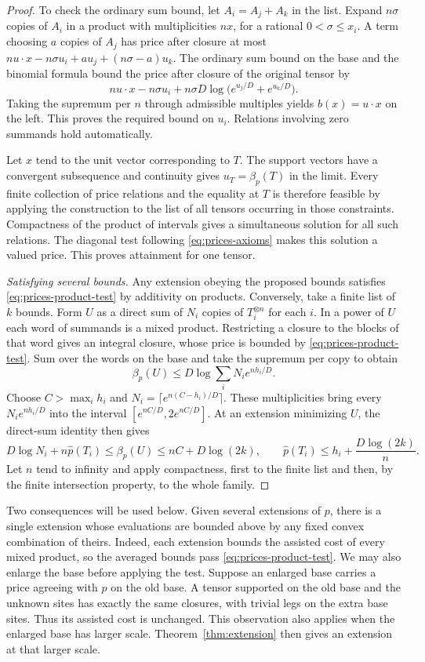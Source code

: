 \begin{proof}
To check the ordinary sum bound, let \(A_i=A_j+A_k\) in the list.
Expand \(n\sigma\) copies of \(A_i\) in a product with multiplicities
\(nx\), for a rational \(0<\sigma\le x_i\). A term choosing \(a\)
copies of \(A_j\) has price after closure at most
\(n u\cdot x-n\sigma u_i+a u_j+(n\sigma-a)u_k\).
The ordinary sum bound on the base and the binomial formula bound
the price after closure of the original tensor by
\[
 n u\cdot x-n\sigma u_i+
 n\sigma D\log\bigl(e^{u_j/D}+e^{u_k/D}\bigr).
\]
Taking the supremum per \(n\) through admissible multiples yields
\(b(x)=u\cdot x\) on the left. This proves the required bound on \(u_i\).
Relations involving zero summands hold automatically.

Let \(x\) tend to the unit vector corresponding to \(T\). The support
vectors have a convergent subsequence and continuity gives
\(u_T=\beta_p(T)\) in the limit. Every finite collection of price
relations and the equality at \(T\) is therefore feasible by applying the
construction to the list of all tensors occurring in those constraints.
Compactness of the product of intervals gives a simultaneous
solution for all such relations. The diagonal test following
\eqref{eq:prices-axioms} makes this solution a valued price. This proves
attainment for one tensor.

\smallskip\noindent
\emph{Satisfying several bounds.}
Any extension obeying the proposed bounds satisfies
\eqref{eq:prices-product-test} by additivity on products. Conversely,
take a finite list of \(k\) bounds. Form \(U\) as a direct sum of
\(N_i\) copies of \(T_i^{\otimes n}\) for each \(i\). In a power of
\(U\) each word of summands is a mixed product. Restricting a closure
to the blocks of that word gives an integral closure, whose price is
bounded by \eqref{eq:prices-product-test}. Sum over the words on the
base and take the supremum per copy to obtain
\[
 \beta_p(U)\le D\log\sum_i N_i e^{nh_i/D}.
\]
Choose \(C>\max_i h_i\) and \(N_i=\lceil e^{n(C-h_i)/D}\rceil\).
These multiplicities bring every \(N_i e^{nh_i/D}\) into the interval
\([e^{nC/D},2e^{nC/D}]\). At an extension minimizing \(U\), the
direct-sum identity then gives
\[
 D\log N_i+n\widehat p(T_i)\le\beta_p(U)\le nC+D\log(2k),
 \qquad
 \widehat p(T_i)\le h_i+\frac{D\log(2k)}{n}.
\]
Let \(n\) tend to infinity and apply compactness, first to the finite
list and then, by the finite intersection property, to the whole family.
\end{proof}

Two consequences will be used below. Given several extensions of \(p\),
there is a single extension whose evaluations are bounded above by any
fixed convex combination of theirs. Indeed, each extension bounds
the assisted cost of every mixed product, so the averaged bounds pass
\eqref{eq:prices-product-test}. We may also enlarge the base before
applying the test. Suppose an enlarged base carries a price agreeing
with \(p\) on the old base. A tensor supported on the old base and the
unknown sites has exactly the same closures, with trivial legs on the
extra base sites. Thus its assisted cost is unchanged. This observation
also applies when the enlarged base has larger scale. Theorem~\ref{thm:extension}
then gives an extension at that larger scale.


